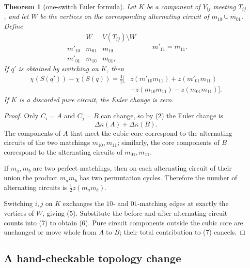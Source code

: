 \documentclass[11pt]{article}
\newtheorem{theorem}{Theorem}
\theoremstyle{definition}
\theoremstyle{remark}
\newcommand{\kap}{\kappa}
\begin{document}
\begin{theorem}[one-switch Euler formula]\label{thm:euler-change}
Let \(K\) be a component of \(Y_{ij}\) meeting \(T_{ij}\), and let \(W\)
be the vertices on the corresponding alternating circuit of
\(m_{10}\cup m_{01}\).  Define
\[
\begin{array}{c|cc}
 &W&V(T_{ij})\setminus W\\ \hline
m'_{10}&m_{01}&m_{10}\\
m'_{01}&m_{10}&m_{01},
\end{array}
\qquad m'_{11}=m_{11}.                                      \tag{5}
\]
If \(q'\) is obtained by switching on \(K\), then
\begin{equation}
\begin{split}
\chi(S(q'))-\chi(S(q))
 =\frac12\bigl[&
 z(m'_{10}m_{11})+z(m'_{01}m_{11})\\
 &-z(m_{10}m_{11})-z(m_{01}m_{11})\bigr].
\end{split}
\tag{6}
\end{equation}
If \(K\) is a discarded pure circuit, the Euler change is zero.
\end{theorem}

\begin{proof}
Only \(C_i=A\) and \(C_j=B\) can change, so by (2) the Euler change is
\[
 \Delta\kap(A)+\Delta\kap(B).                               \tag{7}
\]
The components of \(A\) that meet the cubic core correspond to the
alternating circuits of the two matchings \(m_{10},m_{11}\); similarly,
the core components of \(B\) correspond to the alternating circuits of
\(m_{01},m_{11}\).

If \(m_a,m_b\) are two perfect matchings, then on each alternating circuit
of their union the product \(m_am_b\) has two permutation cycles.
Therefore the number of alternating circuits is
\(\tfrac12z(m_am_b)\).

Switching \(i,j\) on \(K\) exchanges the \(10\)- and \(01\)-matching
edges at exactly the vertices of \(W\), giving (5).  Substitute the
before-and-after alternating-circuit counts into (7) to obtain (6).
Pure circuit components outside the cubic core are unchanged or move
whole from \(A\) to \(B\); their total contribution to (7) cancels.
\end{proof}

\subsection{A hand-checkable topology change}
\end{document}
